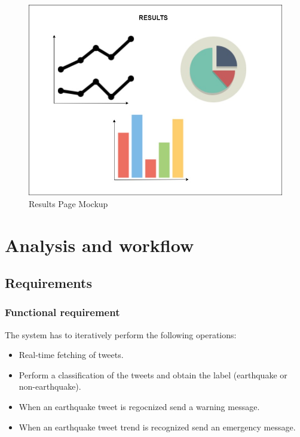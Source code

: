 \documentclass[a4paper, oneside]{article}
\begin{document}
\begin{figure}[h]
\centering
\includegraphics[width=\textwidth]{./images/diagrams/Charts} 
\caption{Results Page Mockup}
\label{fig:mockup}
\end{figure}

\clearpage

\section{Analysis and workflow}

\subsection{Requirements}

\subsubsection{Functional requirement}
The system has to iteratively perform the following operations: 
\begin{itemize}
\item Real-time fetching of tweets.
\item Perform a classification of the tweets and obtain the label (earthquake or non-earthquake).
\item When an earthquake tweet is regocnized send a warning message.
\item When an earthquake tweet trend is recognized send an emergency message.
\end{itemize}
\vspace{2mm}
\end{document}
